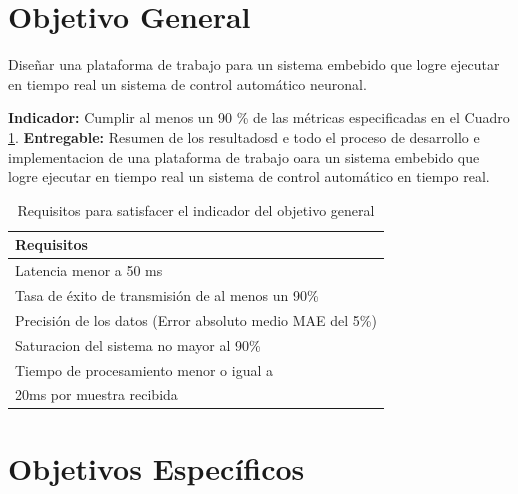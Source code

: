 \documentclass[12pt]{article}
\begin{document}
\section{Objetivo General}

Diseñar una plataforma de trabajo para un sistema embebido que logre ejecutar en tiempo real un sistema de control automático neuronal.

\textbf{Indicador:} Cumplir al menos un 90 \% de las métricas especificadas en el Cuadro \ref{tab:obj_1}.\newline
\textbf{Entregable:} Resumen de los resultadosd e todo el proceso de desarrollo e implementacion de una plataforma de trabajo oara un sistema embebido que logre ejecutar en tiempo real un sistema de control automático en tiempo real.


\begin{table}[!h]
  \centering
  \caption{Requisitos para satisfacer el indicador del objetivo general}
  \label{tab:obj_1}
  \begin{tabular}{|l|}
    \hline
    \rowcolor[HTML]{DAE8FC} 
    Requisitos \\ \hline
    Latencia menor a 50 ms\\ \hline
    Tasa de éxito de transmisión de al menos un 90\%\\ \hline
    Precisión de los datos (Error absoluto medio MAE del 5\%)\\ \hline
    Saturacion del sistema no mayor al 90\% \\ \hline
    Tiempo de procesamiento menor o igual a \\ 20ms por muestra recibida\\ \hline
    \end{tabular}
\end{table}

\section{Objetivos Específicos}
\end{document}
